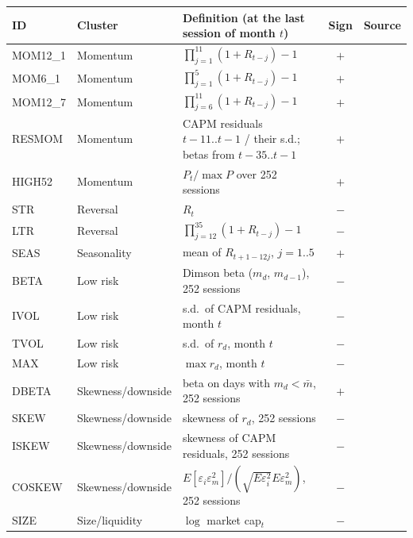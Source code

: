 \begin{tabular}{llp{6.3cm}cl}
\toprule
ID & Cluster & Definition (at the last session of month $t$) & Sign & Source \\
\midrule
MOM12\_1 & Momentum & $\prod_{j=1}^{11}(1+R_{t-j})-1$ & $+$ & \citet{jegadeesh1993returns} \\
MOM6\_1 & Momentum & $\prod_{j=1}^{5}(1+R_{t-j})-1$ & $+$ & \citet{jegadeesh1993returns} \\
MOM12\_7 & Momentum & $\prod_{j=6}^{11}(1+R_{t-j})-1$ & $+$ & \citet{novymarx2012momentum} \\
RESMOM & Momentum & CAPM residuals $t{-}11..t{-}1$ / their s.d.; betas from $t{-}35..t{-}1$ & $+$ & \citet{blitz2011residual} \\
HIGH52 & Momentum & $P_t / \max P$ over 252 sessions & $+$ & \citet{george2004week} \\
\addlinespace[2pt]
STR & Reversal & $R_t$ & $-$ & \citet{jegadeesh1990evidence} \\
LTR & Reversal & $\prod_{j=12}^{35}(1+R_{t-j})-1$ & $-$ & \citet{debondt1985overreact} \\
\addlinespace[2pt]
SEAS & Seasonality & mean of $R_{t+1-12j}$, $j=1..5$ & $+$ & \citet{heston2008seasonality} \\
\addlinespace[2pt]
BETA & Low risk & Dimson beta ($m_d$, $m_{d-1}$), 252 sessions & $-$ & \citet{frazzini2014betting} \\
IVOL & Low risk & s.d.\ of CAPM residuals, month $t$ & $-$ & \citet{ang2006cross} \\
TVOL & Low risk & s.d.\ of $r_d$, month $t$ & $-$ & \citet{ang2006cross} \\
MAX & Low risk & $\max r_d$, month $t$ & $-$ & \citet{bali2011maxing} \\
\addlinespace[2pt]
DBETA & Skewness/downside & beta on days with $m_d<\bar m$, 252 sessions & $+$ & \citet{ang2006downside} \\
SKEW & Skewness/downside & skewness of $r_d$, 252 sessions & $-$ & \citet{amaya2015realized} \\
ISKEW & Skewness/downside & skewness of CAPM residuals, 252 sessions & $-$ & \citet{boyer2010expected} \\
COSKEW & Skewness/downside & $E[\varepsilon_i\varepsilon_m^2]/(\sqrt{E\varepsilon_i^2}E\varepsilon_m^2)$, 252 sessions & $-$ & \citet{harvey2000conditional} \\
\addlinespace[2pt]
SIZE & Size/liquidity & $\log$ market cap$_t$ & $-$ & \citet{banz1981relationship} \\

\end{tabular}
